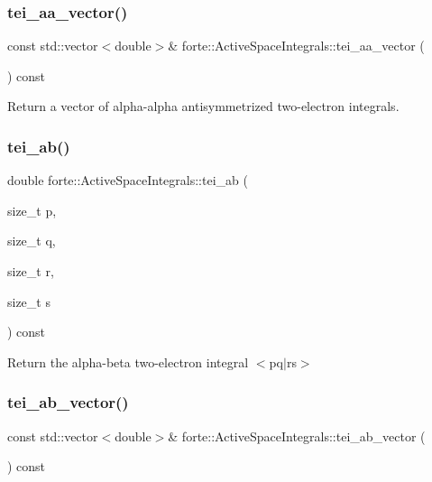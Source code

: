\subsubsection{\texorpdfstring{tei\+\_\+aa\+\_\+vector()}{tei\_aa\_vector()}}
{\footnotesize\ttfamily const std\+::vector$<$double$>$\& forte\+::\+Active\+Space\+Integrals\+::tei\+\_\+aa\+\_\+vector (\begin{DoxyParamCaption}{ }\end{DoxyParamCaption}) const\hspace{0.3cm}{\ttfamily [inline]}}



Return a vector of alpha-\/alpha antisymmetrized two-\/electron integrals. 

\mbox{\label{classforte_1_1_active_space_integrals_a5ba6a11664bc0f72e2a2508f76421ac9}} 
\subsubsection{\texorpdfstring{tei\+\_\+ab()}{tei\_ab()}}
{\footnotesize\ttfamily double forte\+::\+Active\+Space\+Integrals\+::tei\+\_\+ab (\begin{DoxyParamCaption}\item[{size\+\_\+t}]{p,  }\item[{size\+\_\+t}]{q,  }\item[{size\+\_\+t}]{r,  }\item[{size\+\_\+t}]{s }\end{DoxyParamCaption}) const\hspace{0.3cm}{\ttfamily [inline]}}



Return the alpha-\/beta two-\/electron integral $<$pq$\vert$rs$>$ 

\mbox{\label{classforte_1_1_active_space_integrals_a3ffbe588c1db00534668eecccd2959fe}} 
\subsubsection{\texorpdfstring{tei\+\_\+ab\+\_\+vector()}{tei\_ab\_vector()}}
{\footnotesize\ttfamily const std\+::vector$<$double$>$\& forte\+::\+Active\+Space\+Integrals\+::tei\+\_\+ab\+\_\+vector (\begin{DoxyParamCaption}{ }\end{DoxyParamCaption}) const\hspace{0.3cm}{\ttfamily [inline]}}



